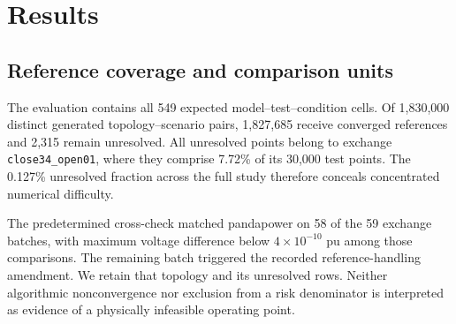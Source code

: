 \begin{abstract}
Voltage surrogates require a decision rule for invoking an exact solver after a feeder changes. We compare neural, physics-only and physics-augmented routes on a synthetic 33-bus feeder, with 15 development and 44 held-out branch exchanges, three training seeds and three test seeds. At a frozen threshold calibrated for 10\% escalation, a residual model using current LinDistFlow information yields 0.0065\% unsafe approvals and 0.0248\% false rejections, versus 0.0615\% and 0.1678\% for physics-only routing. Realized escalation is 8.40\% versus 8.66\%, but the residual route costs more computation. A 10\% impedance underestimate raises its unsafe rate to 2.24\%; stale topology raises it to 14.86\%. Of 1.83 million generated cases, 2,315 remain numerically unresolved and are excluded from decision-risk denominators. The results support learned correction with current network information, while exposing its calibration and verifier limits.
\end{abstract}




\section{Results}
\label{sec:results}

\subsection{Reference coverage and comparison units}

The evaluation contains all 549 expected model--test--condition cells. Of 1,830,000 distinct generated topology--scenario pairs, 1,827,685 receive converged references and 2,315 remain unresolved. All unresolved points belong to exchange \texttt{close34\_open01}, where they comprise 7.72\% of its 30,000 test points. The 0.127\% unresolved fraction across the full study therefore conceals concentrated numerical difficulty.

The predetermined cross-check matched pandapower on 58 of the 59 exchange batches, with maximum voltage difference below $4\times10^{-10}$ pu among those comparisons. The remaining batch triggered the recorded reference-handling amendment. We retain that topology and its unresolved rows. Neither algorithmic nonconvergence nor exclusion from a risk denominator is interpreted as evidence of a physically infeasible operating point.

